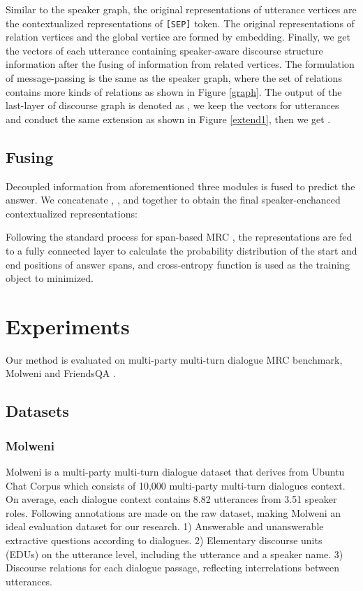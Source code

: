 \documentclass[letterpaper]{article} \usepackage{stylefile}  \usepackage{times}  \usepackage{helvet}  \usepackage{courier}  \usepackage[hyphens]{url}  \usepackage{graphicx} \urlstyle{rm} \def\UrlFont{\rm}  \usepackage{natbib}  \usepackage{caption} \DeclareCaptionStyle{ruled}{labelfont=normalfont,labelsep=colon,strut=off} \frenchspacing  \setlength{\pdfpagewidth}{8.5in}  \setlength{\pdfpageheight}{11in}  \usepackage{algorithm}
\begin{document}
Similar to the speaker graph, the original representations of utterance vertices are the contextualized representations of \texttt{[SEP]} token. The original representations of relation vertices and the global vertice are formed by embedding. Finally, we get the vectors of each utterance containing speaker-aware discourse structure information after the fusing of information from related vertices. The formulation of message-passing is the same as the speaker graph, where the set of relations  contains more kinds of relations as shown in Figure \ref{graph}. The output of the last-layer of discourse graph is denoted as  , we keep the vectors for utterances  and conduct the same extension as shown in Figure \ref{extend1}, then we get .


\subsection{Fusing}
Decoupled information from aforementioned three modules is fused to predict the answer. We concatenate , ,  and  together to obtain the final speaker-enchanced contextualized representations: 


Following the standard process for span-based MRC \cite{devlin2019bert,glass2020span,zhang2021retro}, the representations are fed to a fully connected layer to calculate the probability distribution of the start and end positions of answer spans, and cross-entropy function is used as the training object to minimized.


\section{Experiments}
Our method is evaluated on multi-party multi-turn dialogue MRC benchmark, Molweni \cite{li2020molweni} and FriendsQA \cite{yang-choi-2019-friendsqa}.
\subsection{Datasets}
\subsubsection{Molweni}
Molweni \cite{li2020molweni} is a multi-party multi-turn dialogue dataset that derives from Ubuntu Chat Corpus \cite{Loweubuntu} which consists of 10,000 multi-party multi-turn dialogues context. On average, each dialogue context contains 8.82 utterances from 3.51 speaker roles. Following annotations are made on the raw dataset, making Molweni an ideal evaluation dataset for our research.
1) Answerable and unanswerable extractive questions according to dialogues.
2) Elementary discourse units (EDUs) on the utterance level, including the utterance and a speaker name.
3) Discourse relations for each dialogue passage, reflecting interrelations between utterances. 
\end{document}
